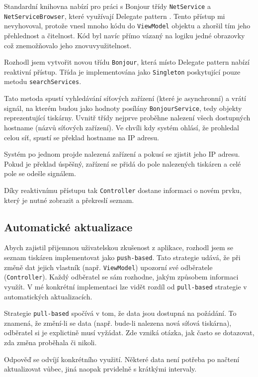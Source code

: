 Standardní knihovna nabízí pro práci s Bonjour třídy \texttt{NetService} a \texttt{NetServiceBrowser}, které využívají Delegate pattern \cite{apple-netservicebrowser}.
Tento přístup mi nevyhovoval, protože vnesl mnoho kódu do \texttt{ViewModel} objektu a zhoršil tím jeho přehlednost a čitelnost.
Kód byl navíc přímo vázaný na logiku jedné obrazovky což znemožňovalo jeho znovuvyužitelnost.

Rozhodl jsem vytvořit novou třídu \texttt{Bonjour}, která místo Delegate pattern nabízí reaktivní přístup.
Třída je implementována jako \texttt{Singleton} \cite{thatthinginswift-singletons} poskytující pouze metodu \texttt{searchServices}.

Tato metoda spustí vyhledávání síťových zařízení (které je asynchronní) a vrátí signál, na kterém budou jako hodnoty posílány \texttt{BonjourService}, tedy objekty reprezentující tiskárny.
Uvnitř třídy nejprve proběhne nalezení všech dostupných hostname (názvů síťových zařízení).
Ve chvíli kdy systém ohlásí, že prohledal celou síť, spustí se překlad hostname na IP adresu.

Systém po jednom projde nalezená zařízení a pokusí se zjistit jeho IP adresu.
Pokud je překlad úspěšný, zařízení se přidá do pole nalezených tiskáren a celé pole se odešle signálem.

Díky reaktivnímu přístupu tak \texttt{Controller} dostane informaci o novém prvku, který je nutné zobrazit a překreslí seznam.

\subsection{Automatické aktualizace}

Abych zajistil přijemnou uživatelskou zkušenost z aplikace, rozhodl jsem se seznam tiskáren implementovat jako \texttt{push-based}.
Tato strategie udává, že při změně dat jejich vlastník (např. \texttt{ViewModel}) upozorní své odběratele (\texttt{Controller}).
Každý odběratel se sám rozhodne, jakým způsobem informaci využít.
V mé konkrétní implementaci lze vidět rozdíl od \texttt{pull-based} strategie v automatických aktualizacích.

Strategie \texttt{pull-based} spočívá v tom, že data jsou dostupná na požádání.
To znamená, že změní-li se data (např. bude-li nalezena nová síťová tiskárna), odběratel si je explictině musí vyžádat.
Zde vzniká otázka, jak často se dotazovat, zda změna proběhala či nikoli.

Odpověď se odvíjí konkrétního využití.
Některé data není potřeba po načtení aktualizovat vůbec, jiná naopak prvidelně s krátkými intervaly.

